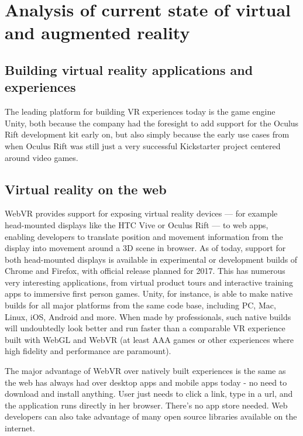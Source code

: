 \section{Analysis of current state of virtual and augmented reality}

\subsection{Building virtual reality applications and experiences}

The leading platform for building VR experiences today is the game engine Unity, both because the company had the foresight to add support for the Oculus Rift development kit early on, but also simply because the early use cases from when Oculus Rift was still just a very successful Kickstarter project centered around video games. 

\subsection{Virtual reality on the web}

WebVR provides support for exposing virtual reality devices — for example head-mounted displays like the HTC Vive or Oculus Rift — to web apps, enabling developers to translate position and movement information from the display into movement around a 3D scene in browser. As of today, support for both head-mounted displays is available in experimental or development builds of Chrome and Firefox, with official release planned for 2017. This has numerous very interesting applications, from virtual product tours and interactive training apps to immersive first person games.
Unity, for instance, is able to make native builds for all major platforms from the same code base, including PC, Mac, Linux, iOS, Android and more. When made by professionals, such native builds will undoubtedly look better and run faster than a comparable VR experience built with WebGL and WebVR (at least AAA games or other experiences where high fidelity and performance are paramount).

The major advantage of WebVR over natively built experiences is the same as the web has always had over desktop apps and mobile apps today - no need to download and install anything. User just needs to click a link, type in a url, and the application runs directly in her browser. There’s no app store needed. Web developers can also take advantage of many open source libraries available on the internet.